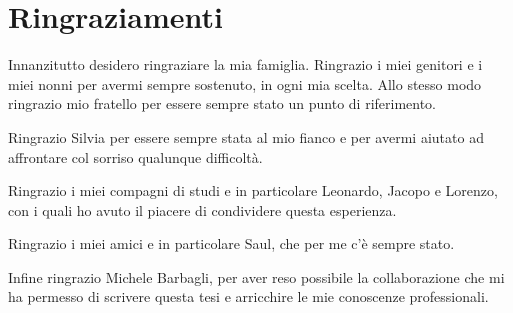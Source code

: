 \chapter*{Ringraziamenti}

Innanzitutto desidero ringraziare la mia famiglia. Ringrazio i miei genitori e i miei nonni per avermi sempre sostenuto, in ogni mia scelta. Allo stesso modo ringrazio mio fratello per essere sempre stato un punto di riferimento.\par
Ringrazio Silvia per essere sempre stata al mio fianco e per avermi aiutato ad affrontare col sorriso qualunque difficolt\`a.\par
Ringrazio i miei compagni di studi e in particolare Leonardo, Jacopo e Lorenzo, con i quali ho avuto il piacere di condividere questa esperienza.\par
Ringrazio i miei amici e in particolare Saul, che per me c'\`e sempre stato.\par
Infine ringrazio Michele Barbagli, per aver reso possibile la collaborazione che mi ha permesso di scrivere questa tesi e arricchire le mie conoscenze professionali.
